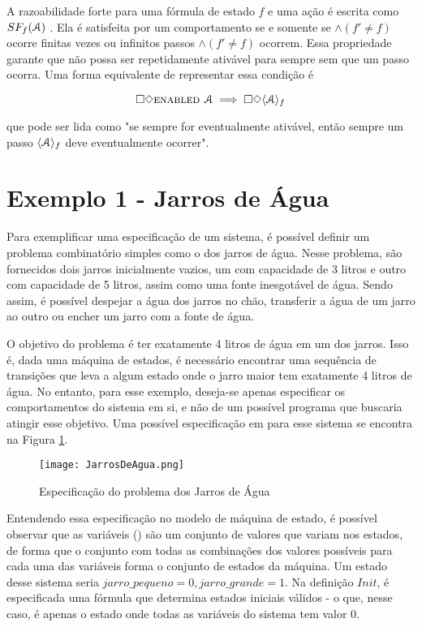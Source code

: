 A razoabilidade forte para uma fórmula de estado $f$ e uma ação \FANCYA é escrita como $SF_f (\textbf{$\mathcal{A}$})$ . Ela é satisfeita por um comportamento se e somente se \FANCYA $\land (f' \neq f)$ ocorre finitas vezes ou infinitos passos \FANCYA $\land (f' \neq f)$ ocorrem. Essa propriedade garante que \FANCYA não possa ser repetidamente ativável para sempre sem que um passo \FANCYA ocorra. Uma forma equivalente de representar essa condição é

\[\square \Diamond \textsc{enabled } \textbf{$\mathcal{A}$} \implies \square \Diamond\langle\textbf{$\mathcal{A}$}\rangle_f\]

que pode ser lida como "se sempre \FANCYA for eventualmente ativável, então sempre um passo $\langle\textbf{$\mathcal{A}$}\rangle_f$ deve eventualmente ocorrer".

\section{Exemplo 1 - Jarros de Água}
\label{exemplo1}

Para exemplificar uma especificação de um sistema, é possível definir um problema combinatório simples como o dos jarros de água. Nesse problema, são fornecidos dois jarros inicialmente vazios, um com capacidade de 3 litros e outro com capacidade de 5 litros, assim como uma fonte inesgotável de água. Sendo assim, é possível despejar a água dos jarros no chão, transferir a água de um jarro ao outro ou encher um jarro com a fonte de água.

O objetivo do problema é ter exatamente 4 litros de água em um dos jarros. Isso é, dada uma máquina de estados, é necessário encontrar uma sequência de transições que leva a algum estado onde o jarro maior tem exatamente 4 litros de água. No entanto, para esse exemplo, deseja-se apenas especificar os comportamentos do sistema em si, e não de um possível programa que buscaria atingir esse objetivo. Uma possível especificação em \TLA para esse sistema se encontra na Figura \ref{fig:ex1tla}.

\begin{figure}
  \centering
  \texttt{[image: JarrosDeAgua.png]}
  \caption{Especificação do problema dos Jarros de Água}
  \label{fig:ex1tla}
\end{figure}

Entendendo essa especificação no modelo de máquina de estado, é possível observar que as variáveis (\VARIABLES) são um conjunto de valores que variam nos estados, de forma que o conjunto com todas as combinações dos valores possíveis para cada uma das variáveis forma o conjunto de estados da máquina. Um estado desse sistema seria $jarro\_pequeno = 0, jarro\_grande = 1$. Na definição $Init$, é especificada uma fórmula que determina estados iniciais válidos - o que, nesse caso, é apenas o estado onde todas as variáveis do sistema tem valor 0.

